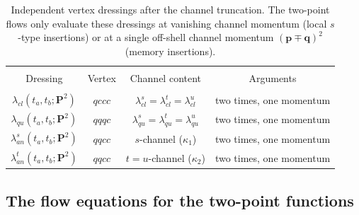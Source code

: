\documentclass[reprint,english,superscriptaddress,preprintnumbers,amsmath,amssymb,aps,prd]{revtex4-1}
\begin{document}
\begin{table}[t]
    \begin{center}
    \centering
    \begin{tabular}{c|c|c|c}
      \hline\hline & & &   \\[-2ex]
      Dressing & Vertex & Channel content & Arguments \\[1ex]
      \hline & & &   \\[-2ex]
      $\lambda_{cl}(t_a,t_b;\boldsymbol{P}^{2})$ & $qccc$ & $\lambda_{cl}^{s}=\lambda_{cl}^{t}=\lambda_{cl}^{u}$ & two times, one momentum \\[1ex]
      $\lambda_{qu}(t_a,t_b;\boldsymbol{P}^{2})$ & $qqqc$ & $\lambda_{qu}^{s}=\lambda_{qu}^{t}=\lambda_{qu}^{u}$ & two times, one momentum \\[1ex]
      $\lambda_{an}^{s}(t_a,t_b;\boldsymbol{P}^{2})$ & $qqcc$ & $s$-channel ($\kappa_{1}$) & two times, one momentum \\[1ex]
      $\lambda_{an}^{t}(t_a,t_b;\boldsymbol{P}^{2})$ & $qqcc$ & $t=u$-channel ($\kappa_{2}$) & two times, one momentum \\[1ex]
      \hline\hline
    \end{tabular}
    \caption{Independent vertex dressings after the channel truncation. The two-point flows only evaluate these dressings at vanishing channel momentum (local $s$-type insertions) or at a single off-shell channel momentum $(\boldsymbol{p}\mp\boldsymbol{q})^{2}$ (memory insertions).}
    \label{tab:dressings}
    \end{center}\vspace{-0.5cm}
\end{table}

\subsection{The flow equations for the two-point functions}
\label{sec:2pointflow}
\end{document}

